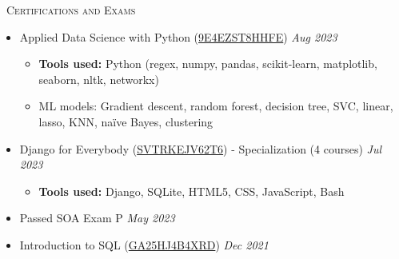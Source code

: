 \documentclass[a4paper,11pt]{article}
\newcommand{\header} [1] {
    \vspace{1mm}
    {\textsc{\large{\xrfill[0.5ex]{0.5pt}~#1~\xrfill[0.5ex]{0.5pt}}}} %
}
\begin{document}
\header{Certifications and Exams} \\
\vspace{1mm}
\begin{itemize}
    \item Applied Data Science with Python (\href{https://www.coursera.org/account/accomplishments/specialization/9E4EZST8HHFE}{9E4EZST8HHFE}) \hfill \emph{Aug 2023}
    \begin{itemize}
        \item \textbf{Tools used:} Python (regex, numpy, pandas, scikit-learn, matplotlib, seaborn, nltk, networkx)
        \item ML models: Gradient descent, random forest, decision tree, SVC, linear, lasso, KNN, na\"{i}ve Bayes, clustering
    \end{itemize}
    \item Django for Everybody (\href{https://www.coursera.org/account/accomplishments/specialization/SVTRKEJV62T6}{SVTRKEJV62T6}) - Specialization (4 courses) \hfill \emph{Jul 2023}
    \begin{itemize}
        \item \textbf{Tools used:} Django, SQLite, HTML5, CSS, JavaScript, Bash
    \end{itemize}
    \item Passed SOA Exam P \hfill \emph{May 2023}
    \item Introduction to SQL (\href{https://www.coursera.org/account/accomplishments/verify/GA25HJ4B4XRD}{GA25HJ4B4XRD}) \hfill  \emph{Dec 2021}
\end{itemize}
\vspace{1mm}


\end{document}
